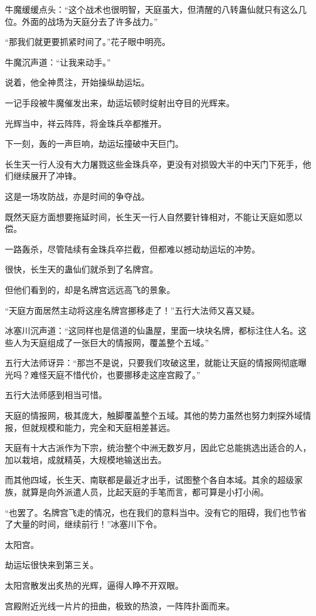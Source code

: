 \begin{this_body}
牛魔缓缓点头：“这个战术也很明智，天庭虽大，但清醒的八转蛊仙就只有这么几位。外面的战场为天庭分去了许多战力。”

“那我们就更要抓紧时间了。”花子眼中明亮。

牛魔沉声道：“让我来动手。”

说着，他全神贯注，开始操纵劫运坛。

一记手段被牛魔催发出来，劫运坛顿时绽射出夺目的光辉来。

光辉当中，祥云阵阵，将金珠兵卒都推开。

下一刻，轰的一声巨响，劫运坛撞破中天巨门。

长生天一行人没有大力屠戮这些金珠兵卒，更没有对损毁大半的中天门下死手，他们继续展开了冲锋。

这是一场攻防战，亦是时间的争夺战。

既然天庭方面想要拖延时间，长生天一行人自然要针锋相对，不能让天庭如愿以偿。

一路轰杀，尽管陆续有金珠兵卒拦截，但都难以撼动劫运坛的冲势。

很快，长生天的蛊仙们就杀到了名牌宫。

但他们看到的，却是名牌宫远远高飞的景象。

“天庭方面居然主动将这座名牌宫挪移走了！”五行大法师又喜又疑。

冰塞川沉声道：“这同样也是信道的仙蛊屋，里面一块块名牌，都标注住人名。这些人为天庭组成了一张巨大的情报网，覆盖整个五域。”

五行大法师讶异：“那岂不是说，只要我们攻破这里，就能让天庭的情报网彻底曝光吗？难怪天庭不惜代价，也要挪移走这座宫殿了。”

五行大法师感到相当可惜。

天庭的情报网，极其庞大，触脚覆盖整个五域。其他的势力虽然也努力刺探外域情报，但就规模和能力，完全和天庭相差甚远。

天庭有十大古派作为下宗，统治整个中洲无数岁月，因此它总能挑选出适合的人，加以栽培，成就精英，大规模地输送出去。

而其他四域，长生天、南联都是最近才出手，试图整个各自本域。其余的超级家族，就算是向外派遣人员，比起天庭的手笔而言，都可算是小打小闹。

“也罢了。名牌宫飞走的情况，也在我们的意料当中。没有它的阻碍，我们也节省了大量的时间，继续前行！”冰塞川下令。

太阳宫。

劫运坛很快来到第三关。

太阳宫散发出炙热的光辉，逼得人睁不开双眼。

宫殿附近光线一片片的扭曲，极致的热浪，一阵阵扑面而来。


\end{this_body}
